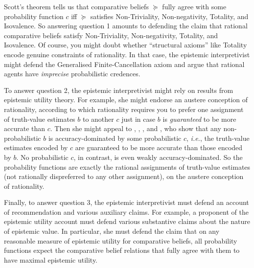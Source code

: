 Scott's theorem tells us that comparative beliefs $\succeq$ fully agree with some probability function $c$ iff $\succeq$ satisfies Non-Triviality, Non-negativity, Totality, and Isovalence. So answering question 1 amounts to defending the claim that rational comparative beliefs satisfy Non-Triviality, Non-negativity, Totality, and Isovalence. Of course, you might doubt whether ``structural axioms'' like Totality encode genuine constraints of rationality. In that case, the epistemic interpretivist might defend the Generalised Finite-Cancellation axiom and argue that rational agents have \textit{imprecise} probabilistic credences.

To answer question 2, the epistemic interpretivist might rely on results from epistemic utility theory. For example, she might endorse an austere conception of rationality, according to which rationality requires you to prefer one assignment of truth-value estimates $b$ to another $c$ just in case $b$ is \textit{guaranteed} to be more accurate than $c$. Then she might appeal to \citet{Joyce1998, Joyce2009}, \citet{Predd2009}, \citet{Schervish2009}, and \citet{Pettigrew2016}, who show that any non-probabilistic $b$ is accuracy-dominated by some probabilistic $c$, \textit{i.e.}, the truth-value estimates encoded by $c$ are guaranteed to be more accurate than those encoded by $b$. No probabilistic $c$, in contrast, is even weakly accuracy-dominated. So the probability functions are exactly the rational assignments of truth-value estimates (not rationally dispreferred to any other assignment), on the austere conception of rationality.

Finally, to answer question 3, the epistemic interpretivist must defend an account of recommendation and various auxiliary claims. For example, a proponent of the epistemic utility account must defend various substantive claims about the nature of epistemic value. In particular, she must defend the claim that on any reasonable measure of epistemic utility for comparative beliefs, all probability functions expect the comparative belief relations that fully agree with them to have maximal epistemic utility.

